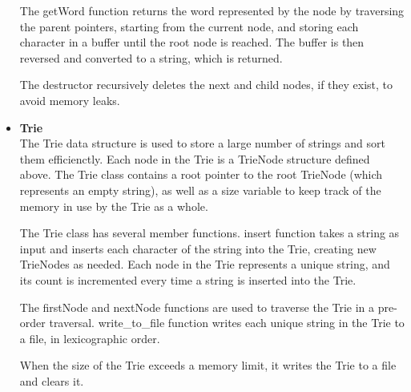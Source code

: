 \documentclass{article}
\begin{document}
\begin{itemize}
                The getWord function returns the word represented by the node by traversing the parent pointers, starting from the current node, and storing each character in a buffer until the root node is reached. The buffer is then reversed and converted to a string, which is returned.
                
                The destructor recursively deletes the next and child nodes, if they exist, to avoid memory leaks.
            \item \textbf{Trie}\\ 
                The Trie data structure is used to store a large number of strings and sort them efficienctly. 
                Each node in the Trie is a TrieNode structure defined above.  The Trie class contains a root pointer to the root TrieNode (which represents an empty string), as well as a size variable to keep track of the memory in use by the Trie as a whole.
            
                The Trie class has several member functions. insert function takes a string as input and inserts each character of the string into the Trie, creating new TrieNodes as needed. Each node in the Trie represents a unique string, and its count is incremented every time a string is inserted into the Trie.
                
                The firstNode and nextNode functions are used to traverse the Trie in a pre-order traversal. write\_to\_file function writes each unique string in the Trie to a file, in lexicographic order.
                
                When the size of the Trie exceeds a memory limit, it writes the Trie to a file and clears it.
        \end{itemize}
\end{document}
